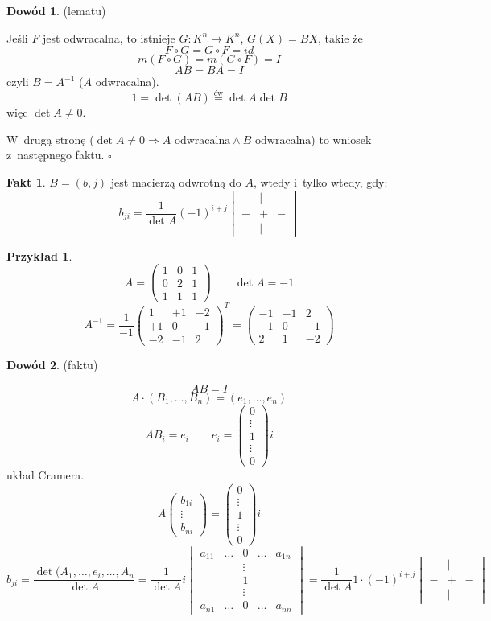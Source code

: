 \documentclass[12pt,a4paper]{article}
\newcommand{\emtarny}{\begin{pmatrix}0\\\vdots\\1\\\vdots\\0\end{pmatrix}}
\newcommand{\skreslona}{\begin{vmatrix}&|&\\-&+&-\\&|&\end{vmatrix}}
\renewcommand{\qed}{$\square$}
\theoremstyle{plain}
\theoremstyle{definition}
\newtheorem{ft}{Fakt}[section]
\theoremstyle{definition}
\theoremstyle{definition}
\theoremstyle{definition}
\newtheorem*{dd}{Dowód}
\theoremstyle{definition}
\theoremstyle{definition}
\newtheorem*{prz}{Przykład}
\theoremstyle{definition}
\theoremstyle{definition}
\theoremstyle{definition}
\begin{document}
\begin{dd}
  (lematu)

  Jeśli $F$ jest odwracalna, to istnieje $G: K^n \rightarrow K^n$, $G(X)=BX$,
  takie że
  \[F \circ G = G \circ F = id\]
  \[m(F \circ G) = m(G \circ F) = I\]
  \[AB = BA = I\]
  czyli $B=A^{-1}$ ($A$ odwracalna).
  \[1 = \det (AB) \overset{\text{ćw}} = \det A \det B\]
  więc $\det A \neq 0$.

  W~drugą stronę ($\det A \neq 0 \Rightarrow A \text{ odwracalna} \land B \text{ odwracalna}$) to wniosek z~następnego faktu.
  \hfill \qed
\end{dd}
\begin{ft}
  $B = (b, j)$ jest macierzą odwrotną do $A$, wtedy i~tylko wtedy, gdy:
  \[b_{ji} = \frac1{\det A}(-1)^{i+j}\skreslona\]
\end{ft}
\begin{prz}
  \[A = \begin{pmatrix}1&0&1\\0&2&1\\1&1&1\end{pmatrix}\qquad\det A = -1\]
  \[A^{-1}=\frac1{-1}\begin{pmatrix}1&+1&-2\\+1&0&-1\\-2&-1&2\end{pmatrix}^T
    =\begin{pmatrix}-1&-1&2\\-1&0&-1\\2&1&-2\end{pmatrix}\]
\end{prz}
\begin{dd}
  (faktu)

  \[AB=I\]
  \[A\cdot(B_1, \dots, B_n)=(e_1, \dots, e_n)\]
  \[AB_i=e_i \qquad e_i = \emtarny i\]
  układ Cramera.
  \[A\begin{pmatrix}b_{1i}\\\vdots\\b_{ni}\end{pmatrix} = \emtarny i\]
    \[b_{ji}=\frac{\det(A_1,\dots,e_i,\dots,A_n}{\det A}=\frac1{\det A}i
    \begin{vmatrix}
      a_{11}&\dots&0&\dots&a_{1n}\\
      &&\vdots&&\\
      &&1&&\\
      &&\vdots&&\\
      a_{n1}&\dots&0&\dots&a_{nn}
    \end{vmatrix} = \frac1{\det A}1\cdot(-1)^{i+j}\skreslona\]
\end{dd}
\end{document}
